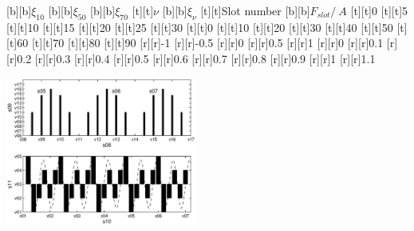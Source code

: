 %    
%
%
\begin{psfrags}%
\psfragscanon%
%
[b][b]{$\xi_{10}$}
[b][b]{$\xi_{50}$}
[b][b]{$\xi_{70}$}
[t][t]{$\nu$}
[b][b]{$\xi_{\nu}$}
[t][t]{Slot number}
[b][b]{$F_{slot}/\SI{}{A}$}
%
[t][t]{0}
[t][t]{5}
[t][t]{10}
[t][t]{15}
[t][t]{20}
[t][t]{25}
[t][t]{30}
[t][t]{0}
[t][t]{10}
[t][t]{20}
[t][t]{30}
[t][t]{40}
[t][t]{50}
[t][t]{60}
[t][t]{70}
[t][t]{80}
[t][t]{90}
%
[r][r]{-1}
[r][r]{-0.5}
[r][r]{0}
[r][r]{0.5}
[r][r]{1}
[r][r]{0}
[r][r]{0.1}
[r][r]{0.2}
[r][r]{0.3}
[r][r]{0.4}
[r][r]{0.5}
[r][r]{0.6}
[r][r]{0.7}
[r][r]{0.8}
[r][r]{0.9}
[r][r]{1}
[r][r]{1.1}

\includegraphics[width=0.47\textwidth]{figs/f_Qs_30_p_10_1.eps}
\end{psfrags}%
%

